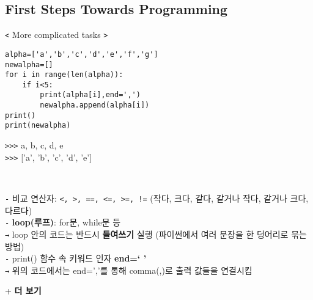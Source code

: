 \documentclass[11pt,a4paper]{article}
\begin{document}
\begin{spacing}{1.5}
\subsection{\Large\textbf{First Steps Towards Programming}}
\texttt{<} More complicated tasks \texttt{>}
\begin{lstlisting}[label={list:first},caption=More complicated tasks Ex (Fibonacci numbers)]
alpha=['a','b','c','d','e','f','g']
newalpha=[]
for i in range(len(alpha)):
    if i<5:
        print(alpha[i],end=',')
        newalpha.append(alpha[i])
print()
print(newalpha)
\end{lstlisting}
\texttt{>>>} a, b, c, d, e\\
\texttt{>>>} ['a', 'b', 'c', 'd', 'e']
\end{spacing}\\

\begin{spacing}{1.5}
\texttt{-} 비교 연산자: \verb|<, >, ==, <=, >=, !=| (작다, 크다, 같다, 같거나 작다, 같거나 크다, 다르다)\\
\texttt{-} \textbf{loop(루프)}: for문, while문 등\\
\hspace*{3em}\texttt{→} loop 안의 코드는 반드시 \textbf{들여쓰기} 실행 (파이썬에서 여러 문장을 한 덩어리로 묶는 방법)\\
\texttt{-} print() 함수 속 키워드 인자 \textbf{end=`  '}\\
\hspace*{3em}\texttt{→} 위의 코드에서는 end=','를 통해 comma(,)로 출력 값들을 연결시킴\\
\end{spacing}

+ {\Large\textbf{더 보기}}\\
\begin{spacing}{1.5}

\end{spacing}

\end{document}
